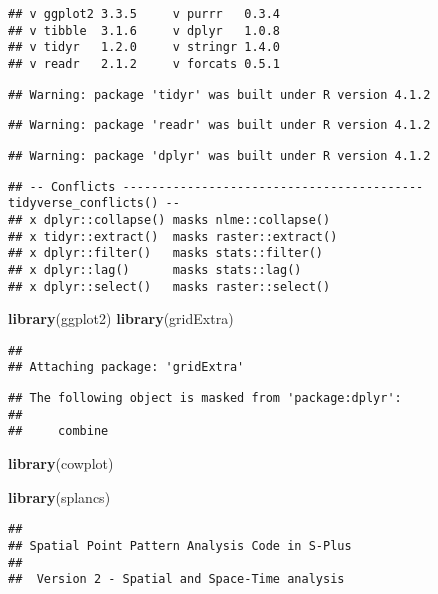 \documentclass[]{article}
\newenvironment{Shaded}{\begin{snugshade}}{\end{snugshade}}
\newcommand{\KeywordTok}[1]{\textcolor[rgb]{0.13,0.29,0.53}{\textbf{#1}}}
\newcommand{\NormalTok}[1]{#1}
\begin{document}
\begin{verbatim}
## v ggplot2 3.3.5     v purrr   0.3.4
## v tibble  3.1.6     v dplyr   1.0.8
## v tidyr   1.2.0     v stringr 1.4.0
## v readr   2.1.2     v forcats 0.5.1
\end{verbatim}

\begin{verbatim}
## Warning: package 'tidyr' was built under R version 4.1.2
\end{verbatim}

\begin{verbatim}
## Warning: package 'readr' was built under R version 4.1.2
\end{verbatim}

\begin{verbatim}
## Warning: package 'dplyr' was built under R version 4.1.2
\end{verbatim}

\begin{verbatim}
## -- Conflicts ------------------------------------------ tidyverse_conflicts() --
## x dplyr::collapse() masks nlme::collapse()
## x tidyr::extract()  masks raster::extract()
## x dplyr::filter()   masks stats::filter()
## x dplyr::lag()      masks stats::lag()
## x dplyr::select()   masks raster::select()
\end{verbatim}

\begin{Shaded}
\begin{Highlighting}[]
\KeywordTok{library}\NormalTok{(ggplot2)}
\KeywordTok{library}\NormalTok{(gridExtra)}
\end{Highlighting}
\end{Shaded}

\begin{verbatim}
## 
## Attaching package: 'gridExtra'
\end{verbatim}

\begin{verbatim}
## The following object is masked from 'package:dplyr':
## 
##     combine
\end{verbatim}

\begin{Shaded}
\begin{Highlighting}[]
\KeywordTok{library}\NormalTok{(cowplot)}

\KeywordTok{library}\NormalTok{(splancs)}
\end{Highlighting}
\end{Shaded}

\begin{verbatim}
## 
## Spatial Point Pattern Analysis Code in S-Plus
##  
##  Version 2 - Spatial and Space-Time analysis
\end{verbatim}
\end{document}
